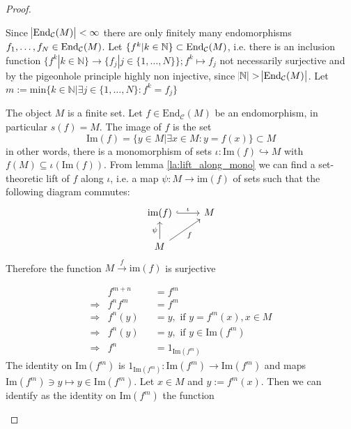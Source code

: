\begin{proof}[Proof\nopunct]
\begin{subproof}[of (1)]

Since $\abs{\textup{End}_{\mathcal{C}}(M)}<\infty$ there are only finitely many endomorphisms
$f_{1},\dots, f_{N} \in \textup{End}_{\mathcal{C}}(M)$.
Let $\{f^{k} | k \in \mathbb{N} \} \subset \textup{End}_{\mathcal{C}}(M)$, i.e. there is an inclusion function 
$\{f^{k} | k \in \mathbb{N}\} \rightarrow \{f_{j} | j \in \{1,\dots,N\}\}; f^{k} \mapsto f_{j}$ not necessarily surjective and 
by the pigeonhole principle highly non injective, since $\abs{\mathbb{N}}>\abs{\textup{End}_{\mathcal{C}}(M)}$.
Let $m := \mathrm{min} \{ k \in \mathbb{N}| \exists j \in \{ 1,\dots,N\} : f^{k} =  f_{j} \}$

The object $M$ is a finite set. Let $f \in \mathrm{End}_{\mathcal{C}}(M)$ be an endomorphism, in particular $s(f) = M$. The image of $f$ is the set 
\[
\mathrm{Im}(f) = \{ y \in M | \exists x \in M : y = f(x)\} \subset M
\]
in other words, there is a monomorphism of sets $\iota : \mathrm{Im}(f) \hookrightarrow M$ with $f(M) \subseteq \iota(\mathrm{Im}(f))$.
From lemma \ref{la:lift_along_mono} we can find a set-theoretic lift of $f$ along $\iota$, i.e. a map $\psi : M \rightarrow \mathrm{im}(f)$ of sets
such that the following diagram commutes:
\[
\begin{tikzcd}
\mathrm{im}(f) \arrow[r, "\iota", hook] & M \\
M \arrow[ru, "f"'] \arrow[u, "\psi"]    &  
\end{tikzcd}
\]
Therefore the function $M \xrightarrow{f} \mathrm{im}(f)$ is surjective
\end{subproof}
\begin{subproof}[Proof of (2).]
\begin{align*}
&f^{m+n} &&= f^{m} \\
\Rightarrow &f^{n}f^{m} &&= f^{m} \\
\Rightarrow &f^{n}(y) &&= y, \text{ if } y = f^{m}(x), x \in M \\
\Rightarrow &f^{n}(y) &&= y, \text{ if } y \in \mathrm{Im}(f^{m}) \\
\Rightarrow &f^{n} &&= 1_{\mathrm{Im}(f^{m})}
\end{align*}
The identity on $\mathrm{Im}(f^{m})$ is $1_{\mathrm{Im}(f^{m})} : \mathrm{Im}(f^{m}) \rightarrow \mathrm{Im}(f^{m})$
and maps $\mathrm{Im}(f^{m})\ni y \mapsto y \in \mathrm{Im}(f^{m})$.
Let $x \in M$ and $y := f^{m}(x)$. Then we can identify as the identity on $\mathrm{Im}(f^{m})$ the function

\end{subproof}
\end{proof}
